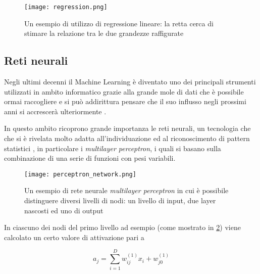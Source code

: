 \begin{figure}[bh]
    \begin{small}
        \begin{center}
            \texttt{[image: regression.png]}
        \end{center}
        \caption{Un esempio di utilizzo di regressione lineare: la retta cerca 
            di stimare la relazione tra le due grandezze raffigurate\cite{John2018}}
        \label{fig:}
    \end{small}
\end{figure}

\subsection{Reti neurali}
\label{section:neural_nets}

Negli ultimi decenni il Machine Learning è diventato uno dei principali strumenti utilizzati in 
ambito informatico grazie alla grande mole di dati che è possibile ormai raccogliere e si può 
addirittura pensare che il suo influsso negli prossimi anni si accrescerà ulteriormente \cite{Smola2008}.

In questo ambito ricoprono grande importanza le reti neurali, un tecnologia che che si è rivelata
molto adatta all'individuazione ed al riconoscimento di pattern statistici \cite{bishop2006pattern},
in particolare i \textit{multilayer perceptron}, i quali si basano sulla combinazione di una serie di funzioni con pesi variabili.

\begin{figure}
    \begin{small}
        \begin{center}
            \texttt{[image: perceptron\_network.png]}
        \end{center}
        \caption{Un esempio di rete neurale \textit{multilayer perceptron} in cui è 
            possibile distinguere diversi livelli di nodi: un livello di input, 
            due layer nascosti ed uno di output \cite{gk_2017}}
        \label{fig:nn}
    \end{small}
\end{figure}

In ciascuno dei nodi del primo livello ad esempio (come mostrato in \ref{fig:nn}) viene calcolato un certo valore 
di attivazione pari a 

\begin{equation}
    a_j = \sum_{i=1}^{D} w_{ij}^{(1)} x_i + w_{j0}^{(1)}
    \label{eq:node_nn}
\end{equation}

